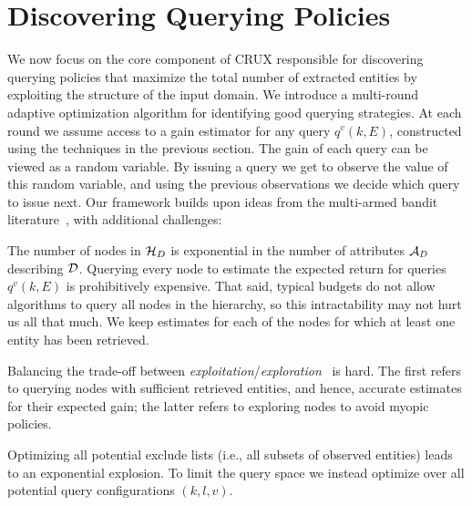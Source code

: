 

\section{Discovering Querying Policies}
\label{sec:solving}
We now focus on the core component of CRUX responsible for discovering querying policies that maximize the total number of extracted entities by exploiting the structure of the input domain.  We introduce a multi-round adaptive optimization algorithm for identifying good querying strategies. At each round we assume access to a gain estimator for any query $q^v(k,E)$, constructed using the techniques in the previous section. The gain of each query can be viewed as a random variable. By issuing a query we get to observe the value of this random variable, and using the previous observations we decide which query to issue next. Our framework builds upon ideas from the multi-armed bandit literature~\cite{Auer:2003,EvenDar06actionelimination}, with additional challenges:

\squishlist
\item The number of nodes in $\mathcal{H}_D$ is exponential in the number of attributes $\mathcal{A}_D$ describing $\mathcal{D}$. Querying every node to estimate the expected return for queries $q^v(k,E)$ is prohibitively expensive. 
\iftr
That said, typical budgets do not allow algorithms to query all nodes in the hierarchy, so this intractability may not hurt us all that much. We keep estimates for each of the nodes for which at least one entity has been retrieved.
\fi
\item Balancing the trade-off between {\em exploitation}/{\em exploration}~\cite{Auer:2003} is hard. The first refers to querying nodes with sufficient retrieved entities, and hence, accurate estimates for their expected gain; the latter refers to exploring nodes to avoid myopic policies.

\item Optimizing all potential exclude lists (i.e., all subsets of observed entities) leads to an exponential explosion. To limit the query space we instead optimize over all potential query configurations $(k,l,v)$.
\squishend

